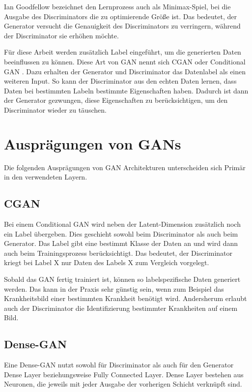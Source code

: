 Ian Goodfellow bezeichnet den Lernprozess auch als Minimax-Spiel, bei die Ausgabe des Discriminators die zu optimierende Größe ist.
Das bedeutet, der Generator versucht die Genauigkeit des Discriminators zu verringern, während der Discriminator sie erhöhen möchte. \cite{gan-minimax} 
\newline


Für diese Arbeit werden zusätzlich Label eingeführt, um die generierten Daten beeinflussen zu können. 
Diese Art von GAN nennt sich CGAN oder Conditional GAN \cite{gan-conditional}.
Dazu erhalten der Generator und Discriminator das Datenlabel als einen weiteren Input.
So kann der Discriminator aus den echten Daten lernen, dass Daten bei bestimmten Labeln bestimmte Eigenschaften haben.
Dadurch ist dann der Generator gezwungen, diese Eigenschaften zu berücksichtigen, um den Discriminator wieder zu täuschen.

\section{Ausprägungen von GANs}
Die folgenden Ausprägungen von GAN Architekturen unterscheiden sich Primär in den verwendeten Layern.

\subsection{CGAN}
Bei einem Conditional GAN wird neben der Latent-Dimension zusätzlich noch ein Label übergeben.
Dies geschieht sowohl beim Discriminator als auch beim Generator.
Das Label gibt eine bestimmt Klasse der Daten an und wird dann auch beim Trainingsprozess berücksichtigt.
Das bedeutet, der Discriminator kriegt bei Label X nur Daten des Labels X zum Vergleich vorgelegt.
\newline

Sobald das GAN fertig trainiert ist, können so labelspezifische Daten generiert werden.
Das kann in der Praxis sehr günstig sein, wenn zum Beispiel das Krankheitsbild einer bestimmten Krankheit benötigt wird.
Andersherum  erlaubt auch der Discriminator die Identifizierung bestimmter Krankheiten auf einem Bild.

\subsection{Dense-GAN}
Eine Dense-GAN nutzt sowohl für Discriminator als auch für den Generator Dense Layer beziehungsweise Fully Connected Layer.
Dense Layer bestehen aus Neuronen, die jeweils mit jeder Ausgabe der vorherigen Schicht verknüpft sind.

